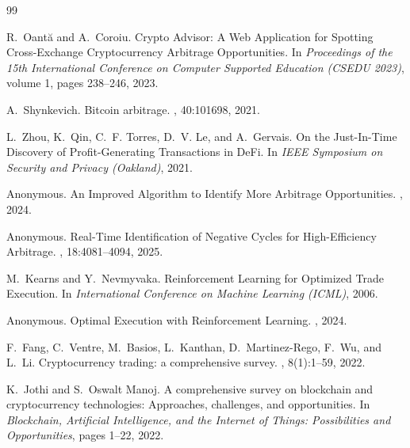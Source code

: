 
% 
% 


\begin{thebibliography}{99}

R.~Oantă and A.~Coroiu.
\newblock Crypto Advisor: A Web Application for Spotting Cross-Exchange Cryptocurrency Arbitrage Opportunities.
\newblock In {\em Proceedings of the 15th International Conference on Computer Supported Education (CSEDU 2023)}, volume 1, pages 238--246, 2023.

A.~Shynkevich.
\newblock Bitcoin arbitrage.
, 40:101698, 2021.

L.~Zhou, K.~Qin, C.~F. Torres, D.~V. Le, and A.~Gervais.
\newblock On the Just-In-Time Discovery of Profit-Generating Transactions in DeFi.
\newblock In {\em IEEE Symposium on Security and Privacy (Oakland)}, 2021.

Anonymous.
\newblock An Improved Algorithm to Identify More Arbitrage Opportunities.
, 2024.

Anonymous.
\newblock Real-Time Identification of Negative Cycles for High-Efficiency Arbitrage.
, 18:4081--4094, 2025.

M.~Kearns and Y.~Nevmyvaka.
\newblock Reinforcement Learning for Optimized Trade Execution.
\newblock In {\em International Conference on Machine Learning (ICML)}, 2006.

Anonymous.
\newblock Optimal Execution with Reinforcement Learning.
, 2024.

F.~Fang, C.~Ventre, M.~Basios, L.~Kanthan, D.~Martinez-Rego, F.~Wu, and L.~Li.
\newblock Cryptocurrency trading: a comprehensive survey.
, 8(1):1--59, 2022.

K.~Jothi and S.~Oswalt Manoj.
\newblock A comprehensive survey on blockchain and cryptocurrency technologies: Approaches, challenges, and opportunities.
\newblock In {\em Blockchain, Artificial Intelligence, and the Internet of Things: Possibilities and Opportunities}, pages 1--22, 2022.


\end{thebibliography}
